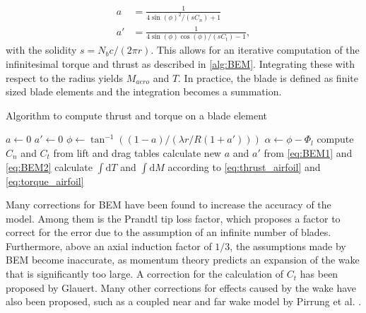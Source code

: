 \begin{align}
a &= \frac{1}{4 \sin(\phi)^2 / \left(s C_n \right) +1} \label{eq:BEM1} \\
a' &= \frac{1}{4 \sin(\phi) \cos(\phi) / \left( s C_t \right) -1}, \label{eq:BEM2}
\end{align}
with the solidity $s = N_b c/(2 \pi r)$. This allows for an iterative computation of the infinitesimal torque and thrust as described in \autoref{alg:BEM}. Integrating these with respect to the radius yields $M_{aero}$ and $T$. In practice, the blade is defined as finite sized blade elements and the integration becomes a summation. \cite[p. 100 - 103]{sorensen_general_2016} \\
\begin{algorithm}
	\caption{Algorithm to compute thrust and torque on a blade element}
	\label{alg:BEM}
	\begin{algorithmic}
			\STATE $a \gets 0$ 
			\STATE $a'\gets 0$
			\REPEAT
				\STATE $\phi \gets \tan^{-1}((1-a)/(\lambda r/R (1+a') ))$
				\STATE $\alpha \gets \phi - \Phi_l$
				\STATE compute $C_n$ and $C_t$ from lift and drag tables
				\STATE calculate new $a$ and $a'$ from \eqref{eq:BEM1} and \eqref{eq:BEM2}
		\ENDFOR
		\STATE calculate $\int \mathrm{d}T$ and $\int \mathrm{d}M$ according to \eqref{eq:thrust_airfoil} and \eqref{eq:torque_airfoil}
	\end{algorithmic}
\end{algorithm}
Many corrections for BEM have been found to increase the accuracy of the model. Among them is the Prandtl tip loss factor, which proposes a factor to correct for the error due to the assumption of an infinite number of blades. Furthermore, above an axial induction factor of $1/3$, the assumptions made by BEM become inaccurate, as momentum theory predicts an expansion of the wake that is significantly too large. A correction for the calculation of $C_t$ has been proposed by Glauert. Many other corrections for effects caused by the wake have also been proposed, such as a coupled near and far wake model by Pirrung et al. \cite{pirrung_coupled_2016}. \cite[p. 103 - 104]{sorensen_general_2016}

